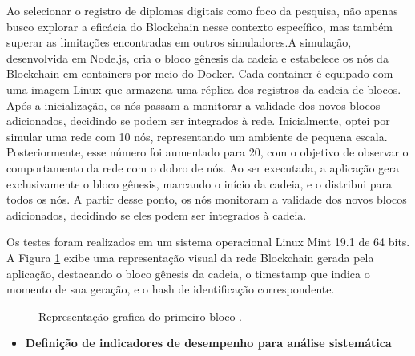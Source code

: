         

        Ao selecionar o registro de diplomas digitais como foco da pesquisa, não apenas busco explorar a eficácia do Blockchain nesse contexto específico, mas também superar as limitações encontradas em outros simuladores.A simulação, desenvolvida em Node.js, cria o bloco gênesis da cadeia e estabelece os nós da Blockchain em containers por meio do Docker. Cada container é equipado com uma imagem Linux que armazena uma réplica dos registros da cadeia de blocos. Após a inicialização, os nós passam a monitorar a validade dos novos blocos adicionados, decidindo se podem ser integrados à rede.\cite{yadav2018performance}
        Inicialmente, optei por simular uma rede com 10 nós, representando um ambiente de pequena escala. Posteriormente, esse número foi aumentado para 20, com o objetivo de observar o comportamento da rede com o dobro de nós. Ao ser executada, a aplicação gera exclusivamente o bloco gênesis, marcando o início da cadeia, e o distribui para todos os nós. A partir desse ponto, os nós monitoram a validade dos novos blocos adicionados, decidindo se eles podem ser integrados à cadeia.

        Os testes foram realizados em um sistema operacional Linux Mint 19.1 de 64 bits. A Figura \ref{Bloco 0} exibe uma representação visual da rede Blockchain gerada pela aplicação, destacando o bloco gênesis da cadeia, o timestamp que indica o momento de sua geração, e o hash de identificação correspondente.

        \begin{figure}[H]
            \centering
            \caption{Representação grafica do primeiro bloco .}
            \label{Bloco 0}
        \end{figure}


        \begin{itemize}[label= $\ast$]
            \item \textbf{Definição de indicadores de desempenho para análise sistemática}
        \end{itemize}

